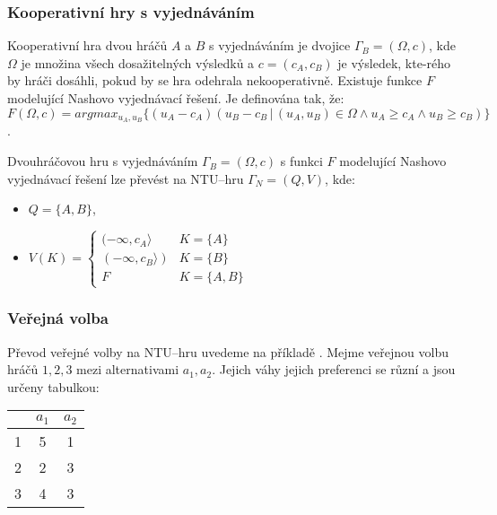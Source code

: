         \subsubsection*{Kooperativní hry s vyjednáváním}
            Kooperativní hra dvou hráčů $A$ a $B$ s vyjednáváním \cite{Hruby2022} je dvojice $\Gamma_B = (\Omega, c)$, kde $\Omega$ je množina všech dosažitelných výsledků a $c = (c_A, c_B)$ je výsledek, kte-rého by hráči dosáhli, pokud by se hra odehrala nekooperativně.  Existuje funkce $F$ modelující Nashovo vyjednávací řešení. Je definována tak, že: $F(\Omega, c) = arg max_{u_A, u_B}\{(u_A - c_A)(u_B - c_B\,|\, (u_A, u_B) \in \Omega \land u_A \geq c_A \land u_B \geq c_B)\}$.

            Dvouhráčovou hru s vyjednáváním $\Gamma_B = (\Omega, c)$ s funkci $F$ modelující Nashovo vyjednávací řešení lze převést na NTU--hru $\Gamma_N = (Q, V)$, kde:

            \begin{itemize}
                \item $Q = \{A, B\}$,
                \item $V(K) = \begin{cases}
                    (-\infty, c_A\rangle & K = \{A\}\\
                    (-\infty, c_B\rangle) & K = \{B\}\\
                    F & K = \{A, B\}
                \end{cases}$
            \end{itemize}
        \subsubsection*{Veřejná volba}
            Převod veřejné volby na NTU--hru uvedeme na příkladě \cite[str. 120]{Game_Theory}. Mejme veřejnou volbu hráčů $1, 2, 3$ mezi alternativami $a_1, a_2$. Jejich váhy jejich preferenci se různí a jsou určeny tabulkou:

            \begin{table}[!h]
                \centering
                \begin{tabular}{|c||c|c|}
                    \hline
                    & $a_1$ & $a_2$\\
                    \hline\hline
                    1 & 5 & 1 \\
                    \hline
                    2 & 2 & 3 \\
                    \hline
                    3 & 4 & 3 \\
                    \hline
                \end{tabular}
            \end{table}

